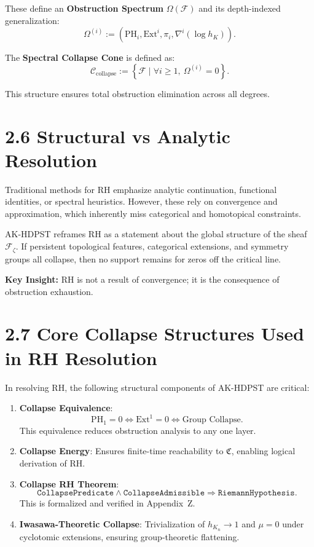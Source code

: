 \documentclass[11pt]{article}
\begin{document}
These define an \textbf{Obstruction Spectrum} \( \Omega(\mathcal{F}) \) and its depth-indexed generalization:
\[
\Omega^{(i)} := \left( \mathrm{PH}_i, \mathrm{Ext}^i, \pi_i, \nabla^i(\log h_K) \right).
\]

The \textbf{Spectral Collapse Cone} is defined as:
\[
\mathcal{C}_{\mathrm{collapse}} := \left\{ \mathcal{F} \mid \forall i \geq 1,\ \Omega^{(i)} = 0 \right\}.
\]

This structure ensures total obstruction elimination across all degrees.

\section*{2.6 Structural vs Analytic Resolution}

Traditional methods for RH emphasize analytic continuation, functional identities, or spectral heuristics. However, these rely on convergence and approximation, which inherently miss categorical and homotopical constraints.

AK-HDPST reframes RH as a statement about the global structure of the sheaf \( \mathcal{F}_{\zeta} \). If persistent topological features, categorical extensions, and symmetry groups all collapse, then no support remains for zeros off the critical line.

\textbf{Key Insight:} RH is not a result of convergence; it is the consequence of obstruction exhaustion.

\section*{2.7 Core Collapse Structures Used in RH Resolution}

In resolving RH, the following structural components of AK-HDPST are critical:

\begin{enumerate}
  \item \textbf{Collapse Equivalence}:
  \[
  \mathrm{PH}_1 = 0 \iff \mathrm{Ext}^1 = 0 \iff \text{Group Collapse}.
  \]
  This equivalence reduces obstruction analysis to any one layer.

  \item \textbf{Collapse Energy}:
  Ensures finite-time reachability to \( \mathfrak{C} \), enabling logical derivation of RH.

  \item \textbf{Collapse RH Theorem}:
  \[
  \texttt{CollapsePredicate} \wedge \texttt{CollapseAdmissible} \Rightarrow \texttt{RiemannHypothesis}.
  \]
  This is formalized and verified in Appendix~Z.

  \item \textbf{Iwasawa-Theoretic Collapse}:
  Trivialization of \( h_{K_n} \to 1 \) and \( \mu = 0 \) under cyclotomic extensions, ensuring group-theoretic flattening.
\end{enumerate}
\end{document}
